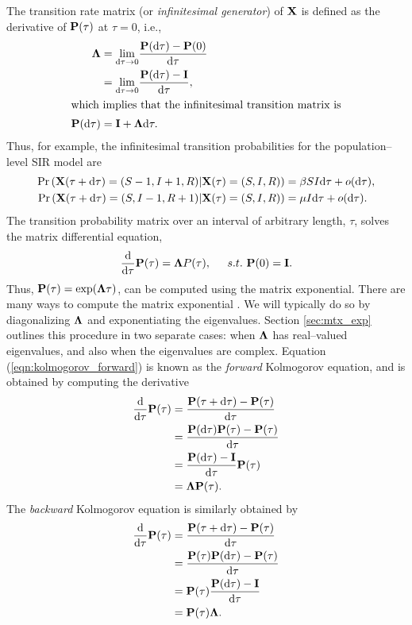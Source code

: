 The transition rate matrix (or \textit{infinitesimal generator}) of $ \mathbf{X} $ is defined as the derivative of $ \mathbf{P}(\tau) $ at $ \tau = 0 $, i.e.,
\begin{align*}
\label{eqn:ctmc_generator}
\boldsymbol{\Lambda} &= \underset{\mathrm{d}\tau \rightarrow 0}{\lim}\frac{\mathbf{P}(\mathrm{d}\tau) - \mathbf{P}(0)}{\mathrm{d}\tau} \\
&= \underset{\mathrm{d}\tau \rightarrow 0}{\lim}\frac{\mathbf{P}(\mathrm{d}\tau) - \mathbf{I}}{\mathrm{d}\tau}, \\
\shortintertext{which implies that the infinitesimal transition matrix is} \mathbf{P}(\mathrm{d}\tau) &= \mathbf{I} + \boldsymbol{\Lambda}\mathrm{d}\tau.
\end{align*}
Thus, for example, the infinitesimal transition probabilities for the population--level SIR model are
\begin{align*}
\Pr\left (\mathbf{X}(\tau+\mathrm{d}\tau) = (S-1, I+1, R) | \mathbf{X}(\tau) = (S,I,R)\right ) &= \beta SI\mathrm{d}\tau + o(\mathrm{d}\tau), \\
\Pr\left (\mathbf{X}(\tau+\mathrm{d}\tau) = (S, I-1, R+1) | \mathbf{X}(\tau) = (S,I,R)\right ) &= \mu I\mathrm{d}\tau + o(\mathrm{d}\tau).
\end{align*}
The transition probability matrix over an interval of arbitrary length, $ \tau $, solves the matrix differential equation,  \begin{equation}\label{eqn:kolmogorov_forward}
\frac{\mathrm{d}}{\mathrm{d}\tau}\mathbf{P}(\tau) = \boldsymbol{\Lambda} P(\tau),\hspace{0.2in} s.t.\  \mathbf{P}(0) = \mathbf{I}.
\end{equation} 
Thus, $ \mathbf{P}(\tau) = \exp(\boldsymbol{\Lambda}\tau) $, can be computed using the matrix exponential. There are many ways to compute the matrix exponential \cite{moler2003nineteen}. We will typically do so by diagonalizing $ \boldsymbol{\Lambda} $ and exponentiating the eigenvalues. Section \ref{sec:mtx_exp} outlines this procedure in two separate cases: when $ \boldsymbol{\Lambda}$ has real--valued eigenvalues, and also when the eigenvalues are complex. Equation (\ref{eqn:kolmogorov_forward}) is known as the \textit{forward} Kolmogorov equation, and is obtained by computing the derivative
\begin{align*}
\frac{\mathrm{d}}{\mathrm{d}\tau}\mathbf{P}(\tau) &= \frac{\mathbf{P}(\tau + \mathrm{d}\tau) - \mathbf{P}(\tau)}{\mathrm{d}\tau} \\
&= \frac{\mathbf{P}(\mathrm{d}\tau)\mathbf{P}(\tau) - \mathbf{P}(\tau)}{\mathrm{d}\tau} \\
&= \frac{\mathbf{P}(\mathrm{d}\tau) - \mathbf{I}}{\mathrm{d}\tau}\mathbf{P}(\tau)\\
&= \boldsymbol{\Lambda} \mathbf{P}(\tau).
\end{align*}
The \textit{backward} Kolmogorov equation is similarly obtained by
\begin{align}
\frac{\mathrm{d}}{\mathrm{d}\tau}\mathbf{P}(\tau) &= \frac{\mathbf{P}(\tau + \mathrm{d}\tau) - \mathbf{P}(\tau)}{\mathrm{d}\tau} \nonumber \\
&= \frac{\mathbf{P}(\tau)\mathbf{P}(\mathrm{d}\tau) - \mathbf{P}(\tau)}{\mathrm{d}\tau} \nonumber \\
&= \mathbf{P}(\tau)\frac{\mathbf{P}(\mathrm{d}\tau) - \mathbf{I}}{\mathrm{d}\tau}\nonumber\\
&= \mathbf{P}(\tau)\boldsymbol{\Lambda} .
\end{align}

